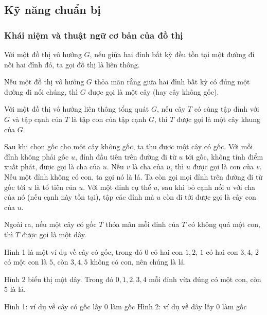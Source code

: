 \documentclass[11pt]{article}
\begin{document}
\subsection{Kỹ năng chuẩn bị}

\subsubsection{Khái niệm và thuật ngữ cơ bản của đồ thị}

Với một đồ thị vô hướng \(G\), nếu giữa hai đỉnh bất kỳ đều tồn tại một đường
đi nối hai đỉnh đó, ta gọi đồ thị là liên thông.

Nếu một đồ thị vô hướng \(G\) thỏa mãn rằng giữa hai đỉnh bất kỳ có đúng một
đường đi nối chúng, thì \(G\) được gọi là một cây (hay cây không gốc).

Với một đồ thị vô hướng liên thông tổng quát \(G\), nếu cây \(T\) có cùng tập
đỉnh với \(G\) và tập cạnh của \(T\) là tập con của tập cạnh \(G\), thì \(T\)
được gọi là một cây khung của \(G\).

Sau khi chọn gốc cho một cây không gốc, ta thu được một cây có gốc. Với mỗi đỉnh
không phải gốc \(u\), đỉnh đầu tiên trên đường đi từ \(u\) tới gốc, không tính
điểm xuất phát, được gọi là cha của \(u\). Nếu \(v\) là cha của \(u\), thì \(u\)
được gọi là con của \(v\). Nếu một đỉnh không có con, ta gọi nó là lá. Ta còn
gọi mọi đỉnh trên đường đi từ gốc tới \(u\) là tổ tiên của \(u\). Với một đỉnh
cụ thể \(u\), sau khi bỏ cạnh nối \(u\) với cha của nó (nếu cạnh này tồn tại),
tập các đỉnh mà \(u\) còn đi tới được gọi là cây con của \(u\).

Ngoài ra, nếu một cây có gốc \(T\) thỏa mãn mỗi đỉnh của \(T\) có không quá một
con, thì \(T\) được gọi là một dây.

Hình 1 là một ví dụ về cây có gốc, trong đó \(0\) có hai con \(1,2\), \(1\) có
hai con \(3,4\), \(2\) có một con là \(5\), còn \(3,4,5\) không có con, nên
chúng là lá.

Hình 2 biểu thị một dây. Trong đó \(0,1,2,3,4\) mỗi đỉnh vừa đúng có một con,
còn \(5\) là lá.

\begin{center}

Hình 1: ví dụ về cây có gốc lấy \(0\) làm gốc \hfill
Hình 2: ví dụ về dây lấy \(0\) làm gốc
\end{center}
\end{document}
